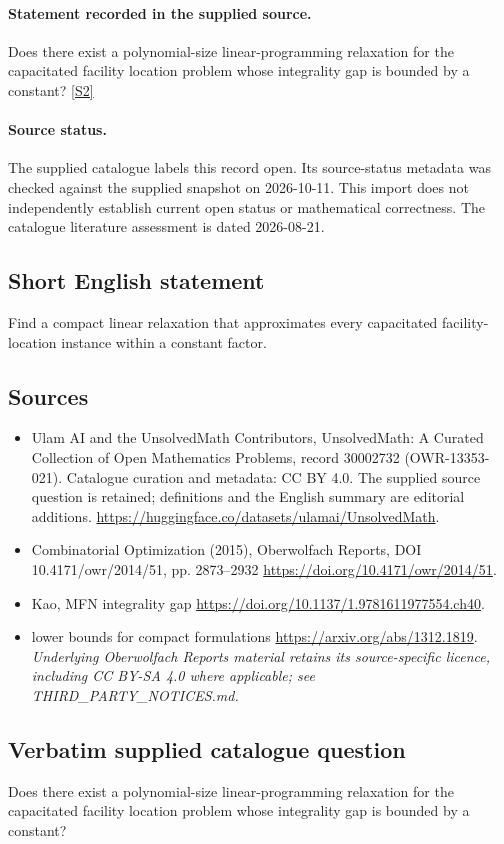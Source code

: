 \documentclass[11pt]{article}
\begin{document}
\paragraph{Statement recorded in the supplied source.}
Does there exist a polynomial-size linear-programming relaxation for the capacitated facility location problem whose integrality gap is bounded by a constant? \href{https://doi.org/10.4171/owr/2014/51}{[S2]}
\paragraph{Source status.}
The supplied catalogue labels this record open. Its source-status metadata was checked against the supplied snapshot on 2026-10-11. This import does not independently establish current open status or mathematical correctness. The catalogue literature assessment is dated 2026-08-21.
\subsection{Short English statement}
Find a compact linear relaxation that approximates every capacitated facility-location instance within a constant factor.
\subsection{Sources}
\begin{itemize}
\item[S1] Ulam AI and the UnsolvedMath Contributors, UnsolvedMath: A Curated Collection of Open Mathematics Problems, record 30002732 (OWR-13353-021). Catalogue curation and metadata: CC BY 4.0. The supplied source question is retained; definitions and the English summary are editorial additions.
\url{https://huggingface.co/datasets/ulamai/UnsolvedMath}.
\item[S2] Combinatorial Optimization (2015), Oberwolfach Reports, DOI 10.4171/owr/2014/51, pp. 2873--2932
\url{https://doi.org/10.4171/owr/2014/51}.
\item[S3] Kao, MFN integrality gap
\url{https://doi.org/10.1137/1.9781611977554.ch40}.
\item[S4] lower bounds for compact formulations
\url{https://arxiv.org/abs/1312.1819}.
\textit{Underlying Oberwolfach Reports material retains its source-specific licence, including CC BY-SA 4.0 where applicable; see THIRD\_PARTY\_NOTICES.md.}
\end{itemize}
\subsection{Verbatim supplied catalogue question}
Does there exist a polynomial-size linear-programming relaxation for the capacitated facility location problem whose integrality gap is bounded by a constant?
\end{document}
